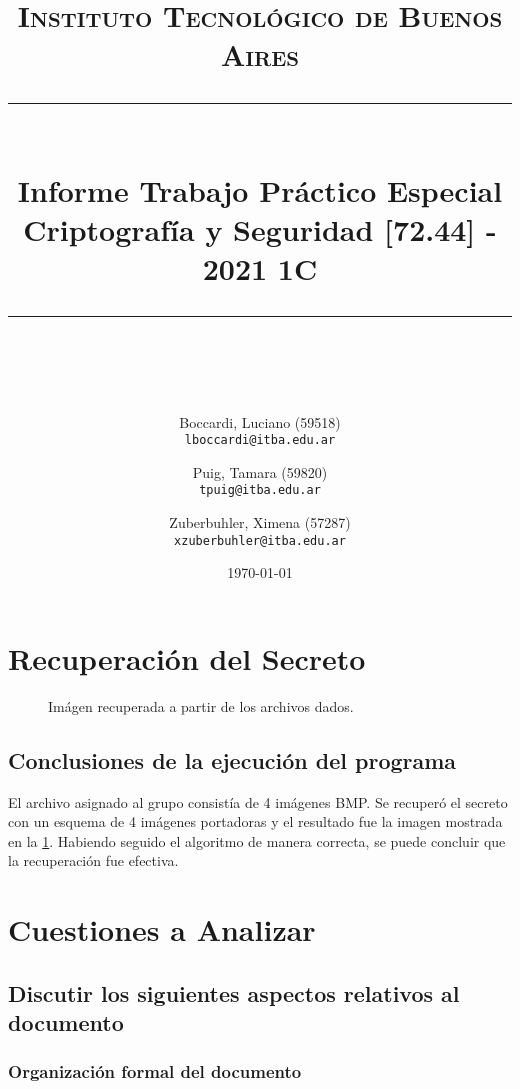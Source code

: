 \documentclass[11pt]{scrartcl} %
\title{	
	\normalfont\normalsize
	\textsc{Instituto Tecnológico de Buenos Aires}\\ %
	\vspace{25pt} %
	\rule{\linewidth}{0.5pt}\\ %
	\vspace{20pt} %
	{\huge Informe Trabajo Práctico Especial}\\ %
	\vspace{25pt} %
	{\huge Criptografía y Seguridad [72.44] - 2021 1C}\\ %
	\vspace{12pt} %
	\rule{\linewidth}{2pt}\\ %
	\vspace{12pt} %
}
\author{
  Boccardi, Luciano (59518)\\
  \texttt{lboccardi@itba.edu.ar}
  \and
  Puig, Tamara (59820)\\
  \texttt{tpuig@itba.edu.ar}
  \and
  Zuberbuhler, Ximena (57287)\\
  \texttt{xzuberbuhler@itba.edu.ar}
}
\date{\normalsize\today} %
\begin{document}
\maketitle %


\newpage

\section{Recuperación del Secreto}

\begin{figure}[h] %
	\centering
	\caption{Imágen recuperada a partir de los archivos dados.}
	\label{secret_image}
\end{figure}


\subsection{Conclusiones de la ejecución del programa}

El archivo asignado al grupo consistía de 4 imágenes BMP. Se recuperó el secreto con un esquema de 4 imágenes portadoras y el resultado fue la imagen mostrada en la \figurename{\ref{secret_image}}. Habiendo seguido el algoritmo de manera correcta, se puede concluir que la recuperación fue efectiva.


\section{Cuestiones a Analizar}

\subsection{Discutir los siguientes aspectos relativos al documento}

\subsubsection{Organización formal del documento}
\end{document}
